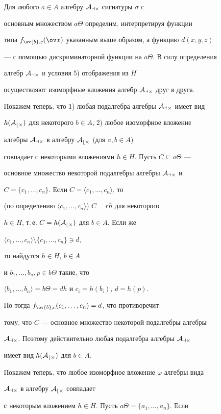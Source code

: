 \begin{pf}
Для любого $a\in A$ алгебру $\cal A_{a\Theta}$ сигнатуры $\sigma$ с


основным множеством $a\Theta$ определим, интерпретируя функции


типа $f_{\ov{b},c}(\x)$ указанным выше образом, а функцию $d(x,y,z)$


--- с помощью дискриминаторной функции на $a\Theta$. В силу определения


алгебр $\cal A_{a\Theta}$ и условия 5) отображения из $H$


осуществляют изоморфные вложения алгебр $\cal A_{a\Theta}$ друг в друга.


Покажем теперь, что 1) любая подалгебра алгебры $\cal A_{a\Theta}$ имеет вид


$h(\cal A_{b\Theta})$ для некоторого $b\in A$, 2) любое изоморфное вложение


алгебры $\cal A_{a\Theta}$ в алгебру $\cal A_{b\Theta}$ (для $a,b\in A$)


совпадает с некоторыми вложениями $h\in H$. Пусть $C\subseteq a\Theta$ ---


основное множество некоторой подалгебры алгебры $\cal A_{a\Theta}$ и


$C=\{c_1,\dotsc,c_n\}$. Если $C=\langle c_1,\dotsc,c_n\rangle$, то


(по определению $\langle c_1,\dotsc,c_n\rangle$) $C=rh$ для некоторого


$h\in H$, т.\,е. $C=h(\cal A_{b\Theta})$ для $b\in A$. Если же


$\langle c_1,\dotsc,c_n\rangle\setminus\{c_1,\dotsc,c_n\}\ni d$,


то найдутся $h\in H$, $b\in A$


и $b_1,\dotsc,b_n,p\in b\Theta$ такие, что


$\langle b_1,\dotsc,b_n\rangle=b\Theta=dh$ и $c_i=h(b_i)$, $d=h(p)$.


Но тогда $f_{\ov{b},c}(c_1,\dotsc,c_n)=d$, что противоречит


тому, что $C$ --- основное множество некоторой подалгебры алгебры


$\cal A_{a\Theta}$. Поэтому действительно любая подалгебра алгебры $\cal A_{a\Theta}$


имеет вид $h(\cal A_{b\Theta})$ для $b\in A$.


Покажем теперь, что любое изоморфное вложение $\varphi$ алгебры вида


$\cal A_{a\Theta}$ в алгебру $\cal A_{b\Theta}$ совпадает


с некоторым вложением $h\in H$. Пусть $a\Theta=\{a_1,\dotsc,a_n\}$. Если



\end{pf}
